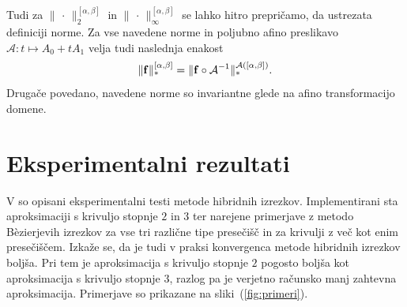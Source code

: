 \documentclass[12pt,a4paper, reqno]{amsart}
\let\oldref\ref
\renewcommand{\ref}[1]{(\oldref{#1})}
\begin{document}
Tudi za $\lVert \,\cdot\, \rVert _2^{[\alpha,\beta]}$ in $\lVert \,\cdot\, \rVert _\infty^{[\alpha,\beta]}$ se lahko hitro prepričamo, da ustrezata definiciji norme. Za vse navedene norme in poljubno afino preslikavo $\mathcal{A}: t\mapsto A_0 + tA_1$ velja tudi naslednja enakost 
\begin{equation*}
\lVert {\bf f} \rVert _{\ast}^{[\alpha,\beta]} = 
\lVert {\bf f} \circ \mathcal{A}^{-1} \rVert _{\ast}^{\mathcal{A}([\alpha,\beta])}.
\end{equation*}
Drugače povedano, navedene norme so invariantne glede na afino transformacijo domene.









\section{Eksperimentalni rezultati}
V \cite{hyb_clip} so opisani eksperimentalni testi metode hibridnih izrezkov. Implementirani sta aproksimaciji s krivuljo stopnje $2$ in $3$ ter narejene primerjave z metodo B\`{e}zierjevih izrezkov za vse tri različne tipe presečišč in za krivulji z več kot enim presečiščem. Izkaže se, da je tudi v praksi konvergenca metode hibridnih izrezkov boljša. Pri tem je aproksimacija s krivuljo stopnje $2$ pogosto boljša kot aproksimacija s krivuljo stopnje $3$, razlog pa je verjetno računsko manj zahtevna aproksimacija. Primerjave so prikazane na sliki~\ref{fig:primeri}.
\end{document}
